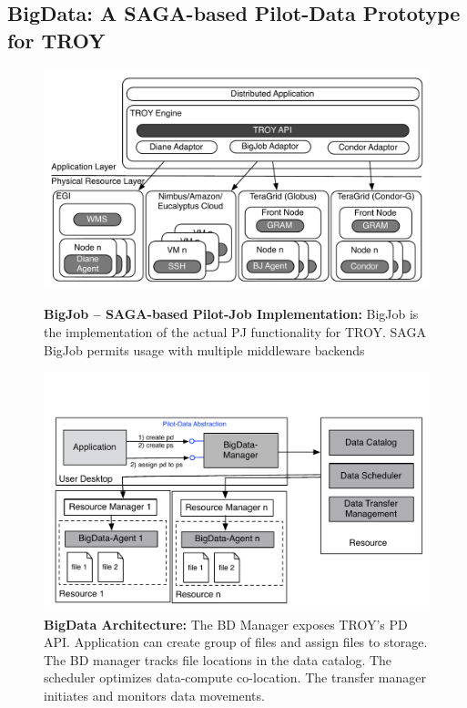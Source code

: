 \subsection*{BigData: A SAGA-based Pilot-Data Prototype for TROY\upp\upp}
\label{sec:bigdata}


\begin{figure}[t]
  \up\up\up
  \begin{minipage}[t]{0.475\linewidth}
    \centering
    \includegraphics[width=\textwidth]{figures/distributed_pilot_job.pdf}
    \caption{\textbf{BigJob -- SAGA-based Pilot-Job Implementation:}
      BigJob is the implementation of the actual PJ functionality for
      TROY. SAGA BigJob permits usage with multiple middleware
      backends~\cite{}}
    \label{fig:figures_distributed_pilot_job}
    \end{minipage}
  \hspace{0.035\linewidth}
  \begin{minipage}[t]{0.475\linewidth}
    \centering
    \includegraphics[width=\textwidth]{figures/pilot-data-manager.pdf}
    \caption{\textbf{BigData Architecture:} The BD Manager exposes
      TROY's PD API. Application can create group of files and assign 
      files to storage. The BD manager tracks file locations in
      the data catalog. The scheduler optimizes data-compute co-location.
      The transfer manager initiates and monitors data movements. \up\up}
    \label{fig:pilot-data-architecture}
    \end{minipage}
\end{figure}

